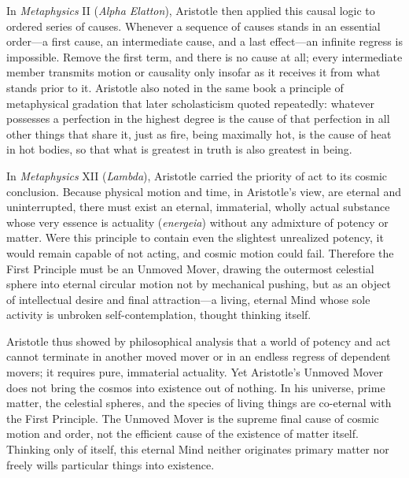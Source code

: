In \emph{Metaphysics} II (\emph{Alpha Elatton}), Aristotle then applied this causal logic to ordered series of causes. Whenever a sequence of causes stands in an essential order---a first cause, an intermediate cause, and a last effect---an infinite regress is impossible. Remove the first term, and there is no cause at all; every intermediate member transmits motion or causality only insofar as it receives it from what stands prior to it. Aristotle also noted in the same book a principle of metaphysical gradation that later scholasticism quoted repeatedly: whatever possesses a perfection in the highest degree is the cause of that perfection in all other things that share it, just as fire, being maximally hot, is the cause of heat in hot bodies, so that what is greatest in truth is also greatest in being.

In \emph{Metaphysics} XII (\emph{Lambda}), Aristotle carried the priority of act to its cosmic conclusion. Because physical motion and time, in Aristotle's view, are eternal and uninterrupted, there must exist an eternal, immaterial, wholly actual substance whose very essence is actuality (\emph{energeia}) without any admixture of potency or matter. Were this principle to contain even the slightest unrealized potency, it would remain capable of not acting, and cosmic motion could fail. Therefore the First Principle must be an Unmoved Mover, drawing the outermost celestial sphere into eternal circular motion not by mechanical pushing, but as an object of intellectual desire and final attraction---a living, eternal Mind whose sole activity is unbroken self-contemplation, thought thinking itself.

Aristotle thus showed by philosophical analysis that a world of potency and act cannot terminate in another moved mover or in an endless regress of dependent movers; it requires pure, immaterial actuality. Yet Aristotle's Unmoved Mover does not bring the cosmos into existence out of nothing. In his universe, prime matter, the celestial spheres, and the species of living things are co-eternal with the First Principle. The Unmoved Mover is the supreme final cause of cosmic motion and order, not the efficient cause of the existence of matter itself. Thinking only of itself, this eternal Mind neither originates primary matter nor freely wills particular things into existence.

